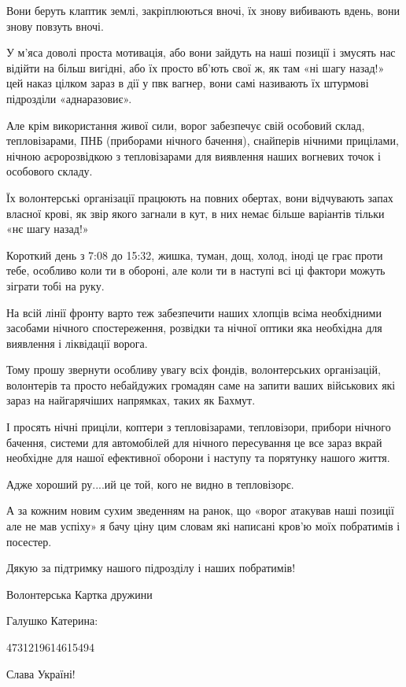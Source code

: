 Вони беруть клаптик землі, закріплюються вночі, їх знову вибивають вдень, вони
знову повзуть вночі.

У м’яса доволі проста мотивація, або вони зайдуть на наші позиції і змусять
нас відійти на більш вигідні, або їх просто вб’ють свої ж, як там «ні шагу
назад!» цей наказ цілком зараз в дії у пвк вагнер, вони самі називають їх
штурмові підрозділи «аднаразовиє».

Але крім використання живої сили, ворог забезпечує свій особовий склад,
тепловізарами, ПНБ (приборами нічного бачення), снайперів  нічними прицілами,
нічною аєророзвідкою з тепловізарами для виявлення наших вогневих точок і
особового складу. 

Їх волонтерські організації працюють на повних обертах, вони відчувають
запах власної крові, як звір якого загнали в кут, в них немає більше
варіантів тільки «нє шагу назад!»

Короткий день з 7:08 до 15:32, жишка, туман, дощ, холод, іноді це грає проти
тебе, особливо коли ти в обороні, але коли ти в наступі всі ці фактори
можуть зіграти тобі на руку. 

На всій лінії фронту варто теж забезпечити наших хлопців всіма необхідними
засобами нічного спостереження, розвідки та нічної оптики яка необхідна для
виявлення і ліквідації ворога.

Тому прошу звернути особливу увагу всіх фондів, волонтерських організацій,
волонтерів та просто небайдужих громадян саме на запити ваших військових які
зараз на найгарячіших напрямках, таких як Бахмут.

І просять нічні приціли, коптери з тепловізарами, тепловізори, прибори
нічного бачення, системи для автомобілей для нічного пересування це все
зараз вкрай необхідне для нашої ефективної оборони і наступу та порятунку
нашого життя.  

Адже хороший ру....ий це той, кого не видно в тепловізорє.

А за кожним новим сухим зведенням на ранок, що «ворог атакував наші позиції
але не мав успіху» я бачу ціну цим словам які написані кров’ю моїх побратимів
і посестер. 

Дякую за підтримку нашого підрозділу і наших побратимів!  

Волонтерська Картка дружини 

Галушко Катерина: 

4731219614615494

Слава Україні!

